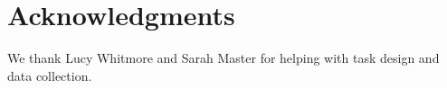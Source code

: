 \documentclass[10pt, letterpaper]{article}
\begin{document}





\section{Acknowledgments}

We thank Lucy Whitmore and Sarah Master for helping with task design and data collection. 




\setlength{\bibleftmargin}{.125in}
\setlength{\bibindent}{-\bibleftmargin}


\end{document}
